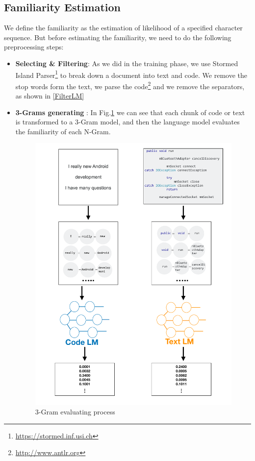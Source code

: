 \documentclass[12pt,mscthesis]{usiinfthesis}
\begin{document}
	\subsection{Familiarity Estimation}
	We define the familiarity as the estimation of likelihood of a specified character sequence. But before estimating the familiarity, we need to do the following preprocessing steps:
	\begin{itemize}
		\item \textbf{Selecting \& Filtering}: As we did in the training phase, we use Stormed Island Parser\footnote{\url{https://stormed.inf.usi.ch}} \cite{Ponz2015a} to break down a document into text and code. We remove the stop words form the text, we parse the code\footnote{\url{http://www.antlr.org}} and we remove the separators, as shown in \cref{FilterLM}
		\item \textbf{3-Grams generating }: In Fig.\ref{3gram-evaluating} we can see that each chunk of code or text is transformed to a 3-Gram model, and then the language model evaluates the familiarity of each N-Gram.
			

			\begin{figure}[htbp]
			\centering
			\includegraphics[width=\textwidth]{3gram-evaluating}
			\caption{3-Gram evaluating process}
			\label{3gram-evaluating}
			\end{figure}	
	

\end{itemize}
\end{document}

